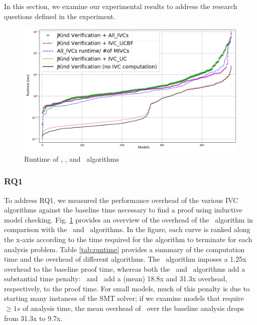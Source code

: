 

In this section, we examine our
experimental results to address the research questions defined in the experiment.

\begin{figure}
 \centering
  \includegraphics[width=\columnwidth]{figs/performance.jpg}
  \vspace{-0.2in}
  \caption{Runtime of \aivcalg, \ucbfalg, and \ucalg ~algorithms}
  \label{fig:performance}
\end{figure}

\subsubsection{RQ1}

To address RQ1, we measured the performance overhead of the various IVC algorithms against the baseline time
necessary to find a proof using inductive model checking. Fig. \ref{fig:performance} provides an overview of the  overhead of the \aivcalg ~algorithm in comparison with the \ucalg ~and \ucbfalg\ algorithms.  In the figure, each curve is ranked along the x-axis according to the time required for the algorithm to terminate for each analysis problem.
Table \ref{tab:runtime} provides a summary of the computation time and the overhead of different algorithms.  The \ucalg\ algorithm imposes a 1.25x overhead to the baseline proof time, whereas both the \ucbfalg\ and \aivcalg\ algorithms add a substantial time penalty: \ucbfalg\ and \aivcalg\ add a (mean) 18.8x and 31.3x overhead, respectively, to the proof time.
For small models, much of this penalty is due to starting many instances of the SMT solver; if we examine models that require $\geq1s$ of analysis time, the mean overhead of \aivcalg\ over the baseline analysis drops from 31.3x to 9.7x.

